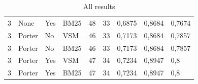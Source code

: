 \begin{table}[h]
{\begin{tabular}{lllllllll}
\rowcolor[HTML]{9B9B9B} 
3                                   & None                           & Yes                              & BM25                            & 48                               & 33                              & 0,6875                           & 0,8684                        & 0,7674                         \\
\rowcolor[HTML]{9B9B9B} 
3                                   & Porter                         & No                               & VSM                             & 46                               & 33                              & 0,7173                           & 0,8684                        & 0,7857                         \\
\rowcolor[HTML]{9B9B9B} 
3                                   & Porter                         & No                               & BM25                            & 46                               & 33                              & 0,7173                           & 0,8684                        & 0,7857                         \\
\rowcolor[HTML]{9B9B9B} 
3                                   & Porter                         & Yes                              & VSM                             & 47                               & 34                              & 0,7234                           & 0,8947                        & 0,8                            \\
\rowcolor[HTML]{9B9B9B} 
3                                   & Porter                         & Yes                              & BM25                            & 47                               & 34                              & 0,7234                           & 0,8947                        & 0,8                           
\end{tabular}}
\caption{All results}
\label{fig:table}
\end{table}

\FloatBarrier


